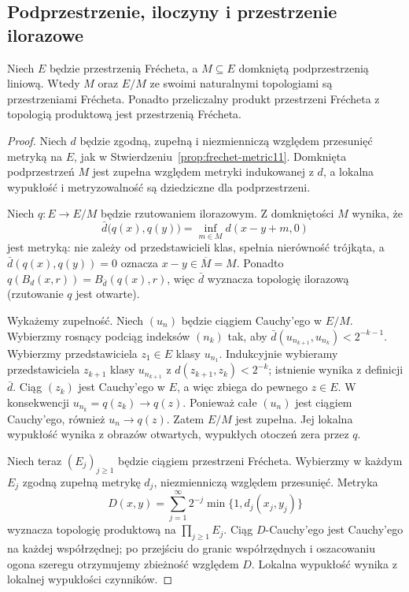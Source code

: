 \subsection{Podprzestrzenie, iloczyny i przestrzenie ilorazowe}

\begin{twierdzenie}\label{thm:frechet-stability11}
Niech $E$ będzie przestrzenią Frécheta, a $M\subseteq E$
domkniętą podprzestrzenią liniową. Wtedy $M$ oraz $E/M$
ze swoimi naturalnymi topologiami są przestrzeniami Frécheta.
Ponadto przeliczalny produkt przestrzeni Frécheta z topologią
produktową jest przestrzenią Frécheta.
\end{twierdzenie}
\begin{proof}
Niech $d$ będzie zgodną, zupełną i niezmienniczą względem
przesunięć metryką na $E$, jak w Stwierdzeniu~\ref{prop:frechet-metric11}.
Domknięta podprzestrzeń $M$ jest zupełna względem metryki
indukowanej z $d$, a lokalna wypukłość i metryzowalność są
dziedziczne dla podprzestrzeni.

Niech $q:E\to E/M$ będzie rzutowaniem ilorazowym.
Z domkniętości $M$ wynika, że
\[
 \bar d\bigl(q(x),q(y)\bigr)=\inf_{m\in M}d(x-y+m,0)
\]
jest metryką: nie zależy od przedstawicieli klas, spełnia
nierówność trójkąta, a $\bar d(q(x),q(y))=0$ oznacza
$x-y\in\overline M=M$. Ponadto
$q(B_d(x,r))=B_{\bar d}(q(x),r)$, więc $\bar d$ wyznacza
topologię ilorazową (rzutowanie $q$ jest otwarte).

Wykażemy zupełność. Niech $(u_n)$ będzie ciągiem Cauchy'ego
w $E/M$. Wybierzmy rosnący podciąg indeksów $(n_k)$ tak,
aby $\bar d(u_{n_{k+1}},u_{n_k})<2^{-k-1}$.
Wybierzmy przedstawiciela $z_1\in E$ klasy $u_{n_1}$.
Indukcyjnie wybieramy przedstawiciela $z_{k+1}$ klasy
$u_{n_{k+1}}$ z $d(z_{k+1},z_k)<2^{-k}$;
istnienie wynika z definicji $\bar d$. Ciąg $(z_k)$
jest Cauchy'ego w $E$, a więc zbiega do pewnego $z\in E$.
W konsekwencji $u_{n_k}=q(z_k)\to q(z)$.
Ponieważ całe $(u_n)$ jest ciągiem Cauchy'ego,
również $u_n\to q(z)$. Zatem $E/M$ jest zupełna.
Jej lokalna wypukłość wynika z obrazów otwartych,
wypukłych otoczeń zera przez $q$.

Niech teraz $(E_j)_{j\ge1}$ będzie ciągiem przestrzeni Frécheta.
Wybierzmy w każdym $E_j$ zgodną zupełną metrykę
$d_j$, niezmienniczą względem przesunięć. Metryka
\[
 D(x,y)=\sum_{j=1}^\infty 2^{-j}\min\{1,d_j(x_j,y_j)\}
\]
wyznacza topologię produktową na $\prod_{j\ge1}E_j$.
Ciąg $D$-Cauchy'ego jest Cauchy'ego na każdej współrzędnej;
po przejściu do granic współrzędnych i oszacowaniu ogona szeregu
otrzymujemy zbieżność względem $D$. Lokalna wypukłość
wynika z lokalnej wypukłości czynników.
\end{proof}

